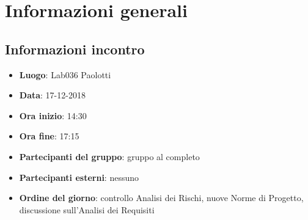 \newcommand{\documento}{\VE}
\newcommand{\nomedocumentofisico}{VE\_17\_12\_2018.pdf}
\newcommand{\redazione}{\LC}
\newcommand{\verifica}{\CV}
\newcommand{\approvazione}{\MM}
\newcommand{\versione}{1.0.0}
\newcommand{\uso}{Esterno}
\newcommand{\destinateTo}{\TV, \\ & \RC, \\ & \II}
\newcommand{\datacreazione}{18 dicembre 2018}
\newcommand{\datamodifica}{19 dicembre 2018}
\newcommand{\stato}{Approvato}

\def\TABELLE{false}	%
\def\FIGURE{false} 	%






    

    
    
	
    
    \section{Informazioni generali}
		\subsection{Informazioni incontro}
			\begin{itemize}
				\item { \textbf{Luogo}: Lab036 Paolotti}
				\item { \textbf{Data}: 17-12-2018}
				\item { \textbf{Ora inizio}: 14:30}
				\item { \textbf{Ora fine}: 17:15}
				\item { \textbf{Partecipanti del gruppo}: gruppo al completo}
				\item { \textbf{Partecipanti esterni}: nessuno}
				\item { \textbf{Ordine del giorno}: controllo Analisi dei Rischi, nuove Norme di Progetto, discussione sull'Analisi dei Requisiti}
			\end{itemize}

